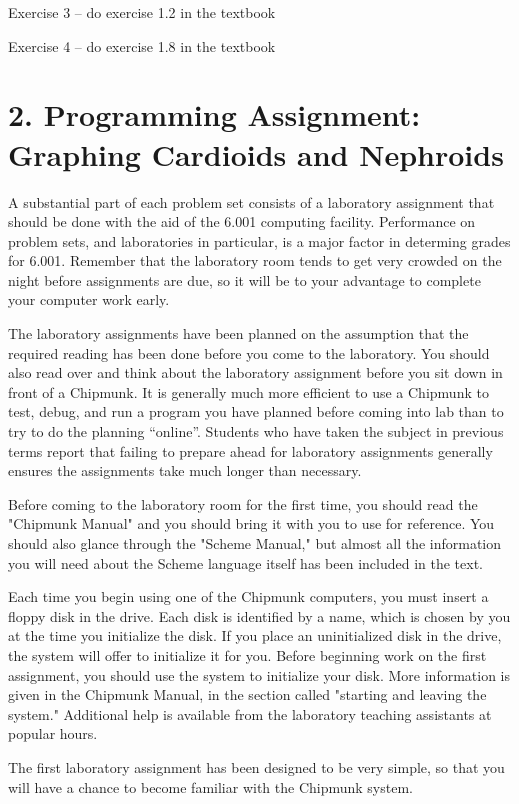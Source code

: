 \bpar
Exercise 3 -- do exercise 1.2 in the textbook

\bpar
Exercise 4 -- do exercise 1.8 in the textbook

\chapter{2. Programming Assignment: Graphing Cardioids and Nephroids}

A substantial part of each problem set consists of a laboratory assignment that
should be done with the aid of the 6.001 computing facility.  Performance on 
problem sets, and laboratories in particular, is a major factor in determing
grades for 6.001.  Remember that the laboratory room tends to get very crowded
on the night before assignments are due, so it will be to your advantage to
complete your computer work early.

The laboratory assignments have been planned 
on the assumption that the required reading has been done before you
come to the laboratory.   You should also read over and think about the
laboratory assignment  before you sit down in front of a Chipmunk.   It
is generally much more efficient to use a Chipmunk to test, debug, and
run a program you have planned before coming into lab than to try to do
the planning ``online''.  Students who have taken the subject in
previous  terms report that failing to prepare ahead for laboratory
assignments generally ensures the assignments take much longer than
necessary.   

Before coming to the laboratory room for the first time, you should read
the "Chipmunk Manual" and you should bring it with you to use for
reference.  You should also glance  through the "Scheme Manual," but
almost all the information you will need about the Scheme language
itself has been included in the text. 

Each time you begin using one of the Chipmunk computers, you must insert a 
floppy disk in the drive.  Each disk is identified by a name, which is chosen
by you at the time you initialize the disk.  If you place an uninitialized disk
in the drive, the system will offer to initialize it for you.  Before beginning
work on the first assignment, you should use the system to initialize your
disk.  More information is given in the Chipmunk Manual, in the section called
"starting and leaving the system."  Additional help is available from the
laboratory teaching assistants at popular hours.

The first laboratory assignment has been designed to be very simple, so that
you will have a chance to become familiar with the Chipmunk system.


